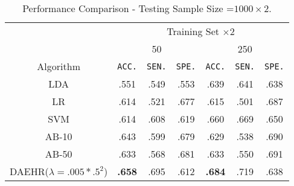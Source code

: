 \begin{table*}
\footnotesize{
\begin{center}
\caption{Performance Comparison - Testing Sample Size =$1000\times 2$.}
		\label{tab:table13_compressed}
\begin{tabular}{*{7}{c}}
\toprule
    &  \multicolumn{6}{c}{Training Set $\times 2$}\\
    \cmidrule(lr){2-7}
    &  
    \multicolumn{3}{c}{50} &
    \multicolumn{3}{c}{250} \\
\cmidrule(lr){2-4}
\cmidrule(lr){5-7}
Algorithm & \texttt{ACC.} & \texttt{SEN.} & \texttt{SPE.} &
                           \texttt{ACC.} & \texttt{SEN.} & \texttt{SPE.} \\
 \cmidrule(lr){1-1}                        
 \cmidrule(lr){2-4}
\cmidrule(lr){5-7}
    LDA &   .551 & .549 & .553 &     .639 & .641 & .638 \\
 
     \cmidrule(lr){1-1}                        
 \cmidrule(lr){2-4}
\cmidrule(lr){5-7}
    LR &   .614 & .521 & .677 &     .615 & .501 & .687 \\
    
    \cmidrule(lr){1-1}                        
 \cmidrule(lr){2-4}
\cmidrule(lr){5-7}
    SVM  &   .614 & .608 & .619 &     .660 & .669 & .650 \\
    \cmidrule(lr){1-1}                        
 \cmidrule(lr){2-4}
\cmidrule(lr){5-7}

   AB-10 &   .643 & .599& .679 &     .629 & .538& .690     \\   
   \cmidrule(lr){1-1}                        
 \cmidrule(lr){2-4}
\cmidrule(lr){5-7}
			
    AB-50 &    .633 & .568 & .681 &     .633 & .550 & .691      \\

     \cmidrule(lr){1-1}                        
 \cmidrule(lr){2-4}
\cmidrule(lr){5-7}
     DAEHR($\lambda=.005*.5^{2}$) &  \textbf{.658} & .695 & .612 &     \textbf{.684} & .719 & .638     \\
       
     \bottomrule
 
\end{tabular}

\end{center}
}
\end{table*}